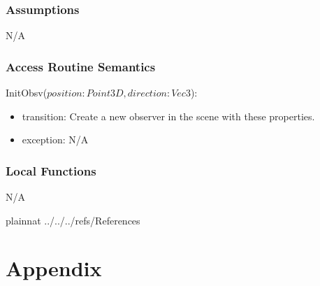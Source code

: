 \documentclass[12pt, titlepage]{article}
\begin{document}
\subsubsection{Assumptions}
N/A

\subsubsection{Access Routine Semantics}

\noindent InitObsv($position : Point3D, direction: Vec3$):
\begin{itemize}
	\item transition: Create a new observer in the scene with these 
	properties.
	\item exception: N/A
\end{itemize}

%

\subsubsection{Local Functions}
N/A

\newpage


 {plainnat}
 {../../../refs/References}

\newpage

\section{Appendix} \label{Appendix}

\end{document}
